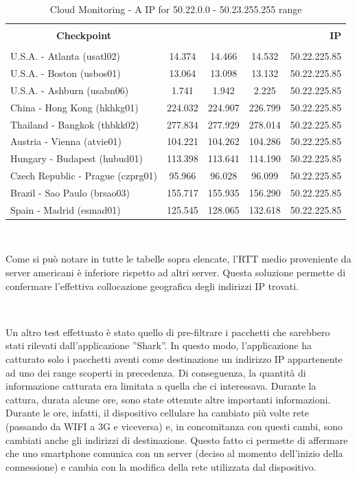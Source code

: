 \documentclass[a4paper,11pt]{book}
\begin{document}
\begin{table}
\label{table:Monitoring_5}
\begin{tabular}{|l|c|c|c|r|}
\hline
\multicolumn{1}{|c|}{\textbf{}} & {\textbf{}} & {\textbf{}} & {\textbf{}} & {\textbf{}}\\
\multicolumn{1}{|c|}{\textbf{Checkpoint}} & {\textbf{RTT minimo} & {\textbf{RTT medio} & {\textbf{RTT massimo} & {\textbf{IP}}\\
\multicolumn{1}{|c|}{\textbf{}} & {\textbf{}} & {\textbf{}} & {\textbf{}} & {\textbf{}}\\
\hline
U.S.A. - Atlanta (usatl02) & 14.374 & 14.466 & 14.532 & 50.22.225.85\\
U.S.A. - Boston (usbos01) & 13.064 & 13.098 & 13.132 & 50.22.225.85\\
U.S.A. - Ashburn (usabn06) & 1.741 & 1.942 & 2.225 & 50.22.225.85\\
China - Hong Kong (hkhkg01) & 224.032 & 224.907 & 226.799 & 50.22.225.85\\
Thailand - Bangkok (thbkk02) & 277.834 & 277.929 & 278.014 & 50.22.225.85\\
Austria - Vienna (atvie01) & 104.221 & 104.262 & 104.286 & 50.22.225.85\\
Hungary - Budapest (hubud01) & 113.398 & 113.641 & 114.190 & 50.22.225.85\\
Czech Republic - Prague (czprg01) & 95.966 & 96.028 & 96.099 & 50.22.225.85\\
Brazil - Sao Paulo (brsao03) & 155.717 & 155.935 & 156.290 & 50.22.225.85\\
Spain - Madrid (esmad01) & 125.545 & 128.065 & 132.618 & 50.22.225.85\\
\hline
\end{tabular}
\caption{Cloud Monitoring - A IP for 50.22.0.0 - 50.23.255.255 range}
\end{table}

~

Come si pu\`o notare in tutte le tabelle sopra elencate, l'RTT medio proveniente da server americani è inferiore rispetto ad altri server. Questa soluzione permette di confermare l'effettiva collocazione geografica degli indirizzi IP trovati.

~

\clearpage

Un altro test effettuato \`e stato quello di pre-filtrare i pacchetti che sarebbero stati rilevati dall'applicazione ''Shark''. In questo modo, l'applicazione ha catturato solo i pacchetti aventi come destinazione un indirizzo IP appartenente ad uno dei range scoperti in precedenza.
Di conseguenza, la quantit\`a di informazione catturata era limitata a quella che ci interessava.
Durante la cattura, durata alcune ore, sono state ottenute altre importanti informazioni. Durante le ore, infatti, il dispositivo cellulare ha cambiato più volte rete (passando da WIFI a 3G e viceversa) e, in concomitanza con questi cambi, sono cambiati anche gli indirizzi di destinazione.
Questo fatto ci permette di affermare che uno smartphone comunica con un server (deciso al momento dell'inizio della connessione) e cambia con la modifica della rete utilizzata dal dispositivo.
\end{document}
